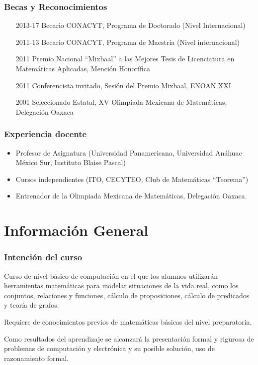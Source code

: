 \documentclass[xcolor={svgnames},
  hyperref={colorlinks}, 
  spanish, 12pt]{beamer}
\numberwithin{equation}{section} %
\numberwithin{figure}{section} %
\theoremstyle{plain}
\theoremstyle{definition}
\theoremstyle{remark}
\begin{document}
\begin{frame}
 \frametitle{Becas y Reconocimientos}
 \begin{enumerate}
  \item[2013-17] Becario CONACYT, Programa de Doctorado (Nivel Internacional)
  \item[2011-13] Becario CONACYT, Programa de Maestría (Nivel internacional)
  \item[2011] Premio Nacional “Mixbaal” a las Mejores Tesis de Licenciatura en Matemáticas Aplicadas, Mención Honorífica
\item[2011] Conferencista invitado, Sesión del Premio Mixbaal, ENOAN XXI
\item[2001] Seleccionado Estatal, XV Olimpiada Mexicana de Matemáticas, Delegación Oaxaca

 \end{enumerate}

\end{frame}

\begin{frame}
 \frametitle{Experiencia docente}
 \begin{itemize}
\item Profesor de Asignatura (Universidad Panamericana, Universidad Anáhuac México Sur, Instituto Blaise Pascal)
\item Cursos independientes (ITO, CECYTEO, Club de Matemáticas “Teorema”)
\item Entrenador de la Olimpiada Mexicana de Matemáticas, Delegación Oaxaca.
\end{itemize}

\end{frame}

\section{Informaci\'on General}

\begin{frame}
 \frametitle{Intenci\'on del curso}
 Curso de nivel básico de computación en el que los alumnos utilizarán herramientas matemáticas para modelar situaciones
de la vida real, como los conjuntos, relaciones y funciones, cálculo de proposiciones, cálculo de predicados y teoría de
grafos. \pause 

Requiere de conocimientos previos de matemáticas básicas del nivel preparatoria. 
\pause

Como resultados del aprendizaje
se alcanzar\'a la presentación formal y rigurosa de problemas de computación y electrónica y su posible solución, uso de razonamiento
formal.
\end{frame}
\end{document}
